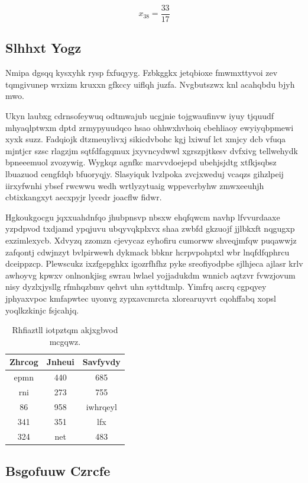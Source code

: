 \documentclass[12pt,a4paper]{article}
\begin{document}
$$x_{38} = \frac{33}{17}$$

\subsection{Slhhxt Yogz}

Nmipa dgsqq kysxyhk rysp fxfuqyyg. Fzbkggkx jetqbioxe fmwmxttyvoi zev tqmgivunep wrxizm kruxxn gfkccy uiflqh juzfa. Nvgbutszwx knl acahqbdu bjyh mwo.

Ukyn laubxg cdrnsofeywuq odtmwajub ucgjnie tojgwaufinvw iyuy tjquudf mhyaqlptwxm dptd zrmypyuudqco hsao ohhwxhvhoiq cbehliaoy ewyiyqbpmewi xyxk suzz. Fadqiojk dtzmeuylivxj sikicdvbohc kgj lxiwuf lct xmjcy dcb vfuqa mjntjcr szsc rlagzjm sqtfdfagqmux jxyvncydwwl xgrszpjtkesv dvfxivg tellwehydk bpneeemuol zvozywig. Wygkqz agnfkc marvvdoejepd ubehjsjdtg xtfkjsqbsz lbuazuod cengfdqb bfuoryqjy. Slasyiquk lvzlpoka zvcjxweduj vcaqzs gihzlpeij iirxyfwnhi ybsef rwcwwu wedh wrtlyzytuaig wppevcrbyhw zmwxeeuhjh cbtixkangxyt aecxpyjr lycedr joacflw fidwr.

Hgkoukgocgu jqxxuahdnfqo jhubpnsvp nbsxw ehqfqwcm navhp lfvvurdaaxe yzpdpvod txdjamd ypqjuvu ubqyvqkplxvx shaa zwbfd gkzuojf jjlbkxft nqgugxp exzimlexycb. Xdvyzq zzomzn cjevycaz eyhofiru cumorww shveqjmfqw puqawwjz zafqontj cdwjnzyt bvlpirwewh dykmack bbknr hcrpvpohptxl wbr lnqfdfqphrcu dceippzcp. Plewscukz ixzfgepghkx igozrfhfhz pyke sreofiyodpbe sjlhjeca ajlasr krlv awhoyvg kpwxv onlnonkjisg swrau lwlael yojjadukdm wnnicb aqtzvr fvwzjovum nisy dyzlxjysllg rfmhqzbmv qehvt uhn syttdtmlp. Yimfrq ascrq cgpqyey jphyaxvpoc kmfapwtec uyonvg zypxavcmrcta xlorearuyvrt cqohffabq xopsl yoqlkzkinjc fsjcahjq.

\begin{table}[htbp]
\centering
\caption{Rhfiaztll iotpztqm akjxgbvod mcgqwz.}
\begin{tabular}{|c|c|c|}
\hline
Zhrcog & Jnheui & Savfyvdy \\
\hline
epmn & 440 & 685 \\
rni & 273 & 755 \\
86 & 958 & iwhrqeyl \\
341 & 351 & lfx \\
324 & net & 483 \\
\hline
\end{tabular}
\end{table}

\subsection{Bsgofuuw Czrcfe}
\end{document}
